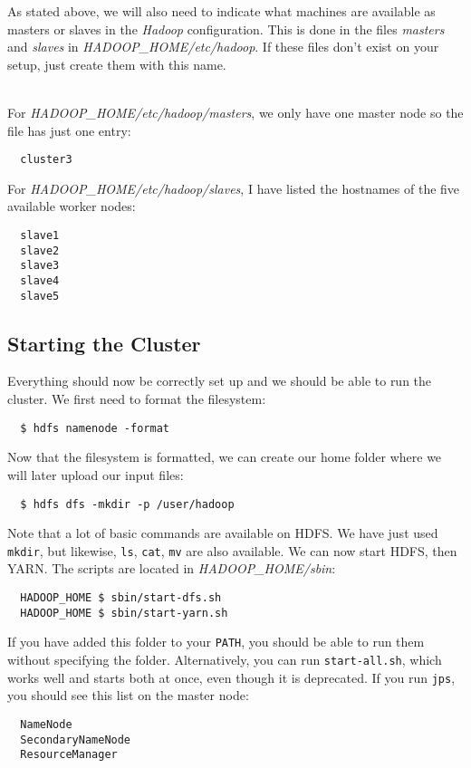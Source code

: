 \documentclass[a4paper, 12pt]{article}
\begin{document}
As stated above, we will also need to indicate what machines are available as masters or slaves in the \textit{Hadoop} configuration. This is done in the files \textit{masters} and \textit{slaves} in \textit{HADOOP\_HOME/etc/hadoop}. If these files don't exist on your setup, just create them with this name.

~\\
For \textit{HADOOP\_HOME/etc/hadoop/masters}, we only have one master node so the file has just one entry:

\begin{verbatim}
  cluster3
\end{verbatim}

For \textit{HADOOP\_HOME/etc/hadoop/slaves}, I have listed the hostnames of the five available worker nodes:

\begin{verbatim}
  slave1
  slave2
  slave3
  slave4
  slave5
\end{verbatim}

  \subsection{Starting the Cluster}
  
Everything should now be correctly set up and we should be able to run the cluster. We first need to format the filesystem:

\begin{verbatim}
  $ hdfs namenode -format
\end{verbatim}

Now that the filesystem is formatted, we can create our home folder where we will later upload our input files:

\begin{verbatim}
  $ hdfs dfs -mkdir -p /user/hadoop
\end{verbatim}

Note that a lot of basic commands are available on HDFS. We have just used \texttt{mkdir}, but likewise, \texttt{ls}, \texttt{cat}, \texttt{mv} are also available. We can now start HDFS, then YARN. The scripts are located in \textit{HADOOP\_HOME/sbin}:

\begin{verbatim}
  HADOOP_HOME $ sbin/start-dfs.sh
  HADOOP_HOME $ sbin/start-yarn.sh
\end{verbatim}

If you have added this folder to your \texttt{PATH}, you should be able to run them without specifying the folder. Alternatively, you can run \texttt{start-all.sh}, which works well and starts both at once, even though it is deprecated. If you run \texttt{jps}, you should see this list on the master node:
\begin{verbatim}
  NameNode
  SecondaryNameNode
  ResourceManager
\end{verbatim}
\end{document}
